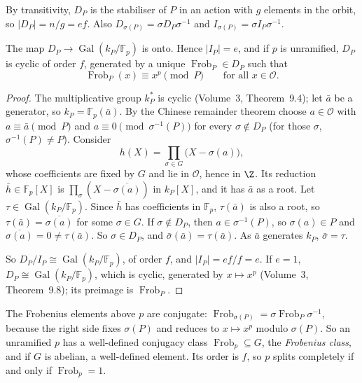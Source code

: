 By transitivity, $D_P$ is the stabiliser of $P$ in an action with $g$ elements in the orbit, so $|D_P|=n/g=ef$. Also
$D_{\sigma(P)}=\sigma D_P\sigma^{-1}$ and $I_{\sigma(P)}=\sigma I_P\sigma^{-1}$.

\begin{theorem}\label{thm:decomp}
The map $D_P\to\operatorname{Gal}(k_P/\mathbb F_p)$ is onto. Hence $|I_P|=e$, and if $p$ is unramified, $D_P$ is cyclic of
order $f$, generated by a unique $\operatorname{Frob}_P\in D_P$ such that
\[
\operatorname{Frob}_P(x)\equiv x^p\pmod P\qquad\text{for all }x\in\mathcal O.
\]
\end{theorem}
\begin{proof}
The multiplicative group $k_P^*$ is cyclic (Volume~3, Theorem~9.4); let $\bar a$ be a generator, so $k_P=\mathbb F_p(\bar
a)$. By the Chinese remainder theorem choose $a\in\mathcal O$ with $a\equiv\bar a\pmod P$ and $a\equiv0\pmod
{\sigma^{-1}(P)}$ for every $\sigma\notin D_P$ (for those $\sigma$, $\sigma^{-1}(P)\ne P$). Consider
\[
h(X)=\prod_{\sigma\in G}\bigl(X-\sigma(a)\bigr),
\]
whose coefficients are fixed by $G$ and lie in $\mathcal O$, hence in $\Z$. Its reduction $\bar h\in\mathbb F_p[X]$ is
$\prod_\sigma(X-\overline{\sigma(a)})$ in $k_P[X]$, and it has $\bar a$ as a root. Let $\tau\in
\operatorname{Gal}(k_P/\mathbb F_p)$. Since $\bar h$ has coefficients in $\mathbb F_p$, $\tau(\bar a)$ is also a root, so
$\tau(\bar a)=\overline{\sigma(a)}$ for some $\sigma\in G$. If $\sigma\notin D_P$, then $a\in\sigma^{-1}(P)$, so
$\sigma(a)\in P$ and $\overline{\sigma(a)}=0\ne\tau(\bar a)$. So $\sigma\in D_P$, and $\bar\sigma(\bar a)=\tau(\bar a)$.
As $\bar a$ generates $k_P$, $\bar\sigma=\tau$.

So $D_P/I_P\cong\operatorname{Gal}(k_P/\mathbb F_p)$, of order $f$, and $|I_P|=ef/f=e$. If $e=1$, $D_P\cong
\operatorname{Gal}(k_P/\mathbb F_p)$, which is cyclic, generated by $x\mapsto x^p$ (Volume~3, Theorem~9.8); its preimage is
$\operatorname{Frob}_P$.
\end{proof}

The Frobenius elements above $p$ are conjugate: $\operatorname{Frob}_{\sigma(P)}=\sigma\operatorname{Frob}_P\sigma^{-1}$,
because the right side fixes $\sigma(P)$ and reduces to $x\mapsto x^p$ modulo $\sigma(P)$. So an unramified $p$ has a
well-defined conjugacy class $\operatorname{Frob}_p\subseteq G$, the \emph{Frobenius class}, and if $G$ is abelian, a
well-defined element. Its order is $f$, so $p$ splits completely if and only if $\operatorname{Frob}_p=1$.

